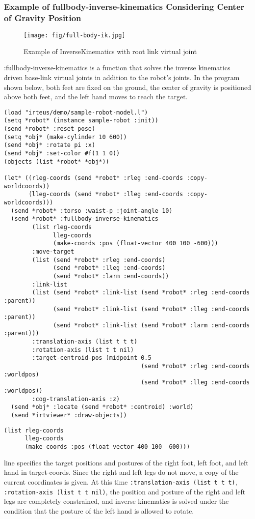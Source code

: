\subsubsection{Example of fullbody-inverse-kinematics Considering Center of Gravity Position}
\begin{figure}[htb]
  \begin{center}
    \texttt{[image: fig/full-body-ik.jpg]}
    \caption{Example of InverseKinematics with root link virtual joint}
  \end{center}
\end{figure}
:fullbody-inverse-kinematics is a function that solves the inverse kinematics driven base-link virtual joints in addition to the robot's joints. In the program shown below, both feet are fixed on the ground, the center of gravity is positioned above both feet, and the left hand moves to reach the target.
{\baselineskip=10pt
\begin{verbatim}
(load "irteus/demo/sample-robot-model.l")
(setq *robot* (instance sample-robot :init))
(send *robot* :reset-pose)
(setq *obj* (make-cylinder 10 600))
(send *obj* :rotate pi :x)
(send *obj* :set-color #f(1 1 0))
(objects (list *robot* *obj*))

(let* ((rleg-coords (send *robot* :rleg :end-coords :copy-worldcoords))
       (lleg-coords (send *robot* :lleg :end-coords :copy-worldcoords)))
  (send *robot* :torso :waist-p :joint-angle 10)
  (send *robot* :fullbody-inverse-kinematics
        (list rleg-coords
              lleg-coords
              (make-coords :pos (float-vector 400 100 -600)))
        :move-target
        (list (send *robot* :rleg :end-coords)
              (send *robot* :lleg :end-coords)
              (send *robot* :larm :end-coords))
        :link-list
        (list (send *robot* :link-list (send *robot* :rleg :end-coords :parent))
              (send *robot* :link-list (send *robot* :lleg :end-coords :parent))
              (send *robot* :link-list (send *robot* :larm :end-coords :parent)))
        :translation-axis (list t t t)
        :rotation-axis (list t t nil)
        :target-centroid-pos (midpoint 0.5
                                       (send *robot* :rleg :end-coords :worldpos)
                                       (send *robot* :lleg :end-coords :worldpos))
        :cog-translation-axis :z)
  (send *obj* :locate (send *robot* :centroid) :world)
  (send *irtviewer* :draw-objects))
\end{verbatim}
}

{\baselineskip=10pt
\begin{verbatim}
(list rleg-coords
      lleg-coords
      (make-coords :pos (float-vector 400 100 -600)))
\end{verbatim}
}
line specifies the target positions and postures of the right foot, left foot, and left hand in target-coords.
Since the right and left legs do not move, a copy of the current coordinates is given.
At this time
\verb|:translation-axis (list t t t)|,
\verb|:rotation-axis (list t t nil)|, the position and posture of the right and left legs are completely constrained, and inverse kinematics is solved under the condition that the posture of the left hand is allowed to rotate.

